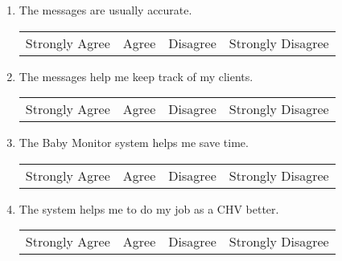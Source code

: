 \begin{enumerate}
{\begin{center}
\begin{tabular}{c c c c}
\end{tabular}
\end{center}}
\item The messages are usually accurate. 
{\begin{center}
\begin{tabular}{c c c c}
Strongly Agree & Agree & Disagree & Strongly Disagree \\
\end{tabular}
\end{center}}
\item The messages help me keep track of my clients.
{\begin{center}
\begin{tabular}{c c c c}
Strongly Agree & Agree & Disagree & Strongly Disagree \\
\end{tabular}
\end{center}} 
\item The Baby Monitor system helps me save time.
{\begin{center}
\begin{tabular}{c c c c}
Strongly Agree & Agree & Disagree & Strongly Disagree \\
\end{tabular}
\end{center}}  
\item The system helps me to do my job as a CHV better.
{\begin{center}
\begin{tabular}{c c c c}
Strongly Agree & Agree & Disagree & Strongly Disagree \\
\end{tabular}
\end{center}} 


\end{enumerate}